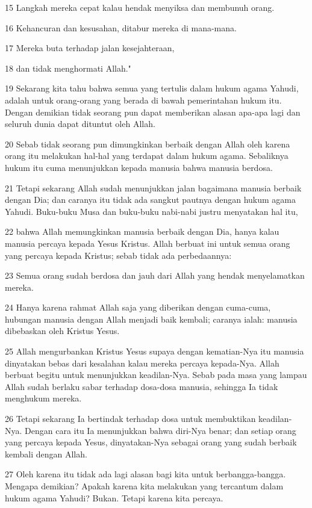 \par 15 Langkah mereka cepat kalau hendak menyiksa dan membunuh orang.
\par 16 Kehancuran dan kesusahan, ditabur mereka di mana-mana.
\par 17 Mereka buta terhadap jalan kesejahteraan,
\par 18 dan tidak menghormati Allah."
\par 19 Sekarang kita tahu bahwa semua yang tertulis dalam hukum agama Yahudi, adalah untuk orang-orang yang berada di bawah pemerintahan hukum itu. Dengan demikian tidak seorang pun dapat memberikan alasan apa-apa lagi dan seluruh dunia dapat dituntut oleh Allah.
\par 20 Sebab tidak seorang pun dimungkinkan berbaik dengan Allah oleh karena orang itu melakukan hal-hal yang terdapat dalam hukum agama. Sebaliknya hukum itu cuma menunjukkan kepada manusia bahwa manusia berdosa.
\par 21 Tetapi sekarang Allah sudah menunjukkan jalan bagaimana manusia berbaik dengan Dia; dan caranya itu tidak ada sangkut pautnya dengan hukum agama Yahudi. Buku-buku Musa dan buku-buku nabi-nabi justru menyatakan hal itu,
\par 22 bahwa Allah memungkinkan manusia berbaik dengan Dia, hanya kalau manusia percaya kepada Yesus Kristus. Allah berbuat ini untuk semua orang yang percaya kepada Kristus; sebab tidak ada perbedaannya:
\par 23 Semua orang sudah berdosa dan jauh dari Allah yang hendak menyelamatkan mereka.
\par 24 Hanya karena rahmat Allah saja yang diberikan dengan cuma-cuma, hubungan manusia dengan Allah menjadi baik kembali; caranya ialah: manusia dibebaskan oleh Kristus Yesus.
\par 25 Allah mengurbankan Kristus Yesus supaya dengan kematian-Nya itu manusia dinyatakan bebas dari kesalahan kalau mereka percaya kepada-Nya. Allah berbuat begitu untuk menunjukkan keadilan-Nya. Sebab pada masa yang lampau Allah sudah berlaku sabar terhadap dosa-dosa manusia, sehingga Ia tidak menghukum mereka.
\par 26 Tetapi sekarang Ia bertindak terhadap dosa untuk membuktikan keadilan-Nya. Dengan cara itu Ia menunjukkan bahwa diri-Nya benar; dan setiap orang yang percaya kepada Yesus, dinyatakan-Nya sebagai orang yang sudah berbaik kembali dengan Allah.
\par 27 Oleh karena itu tidak ada lagi alasan bagi kita untuk berbangga-bangga. Mengapa demikian? Apakah karena kita melakukan yang tercantum dalam hukum agama Yahudi? Bukan. Tetapi karena kita percaya.
